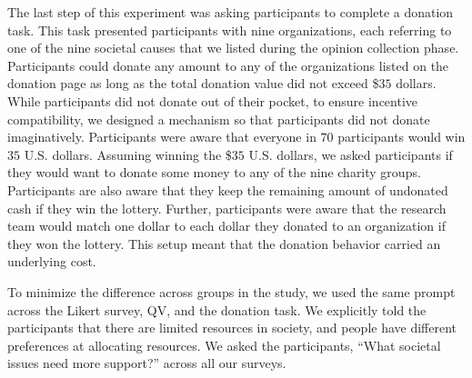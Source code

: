 The last step of this experiment was asking participants to complete a donation task. This task presented participants with nine organizations, each referring to one of the nine societal causes that we listed during the opinion collection phase. Participants could donate any amount to any of the organizations listed on the donation page as long as the total donation value did not exceed \$$35$ dollars. While participants did not donate out of their pocket, to ensure incentive compatibility, we designed a mechanism so that participants did not donate imaginatively. Participants were aware that everyone in $70$ participants would win $35$ U.S. dollars. Assuming winning the \$$35$ U.S. dollars, we asked participants if they would want to donate some money to any of the nine charity groups. Participants are also aware that they keep the remaining amount of undonated cash if they win the lottery. Further, participants were aware that the research team would match one dollar to each dollar they donated to an organization if they won the lottery. This setup meant that the donation behavior carried an underlying cost.

To minimize the difference across groups in the study, we used the same prompt across the Likert survey, QV, and the donation task. We explicitly told the participants that there are limited resources in society, and people have different preferences at allocating resources. We asked the participants, 
``What societal issues need more support?'' across all our surveys.

